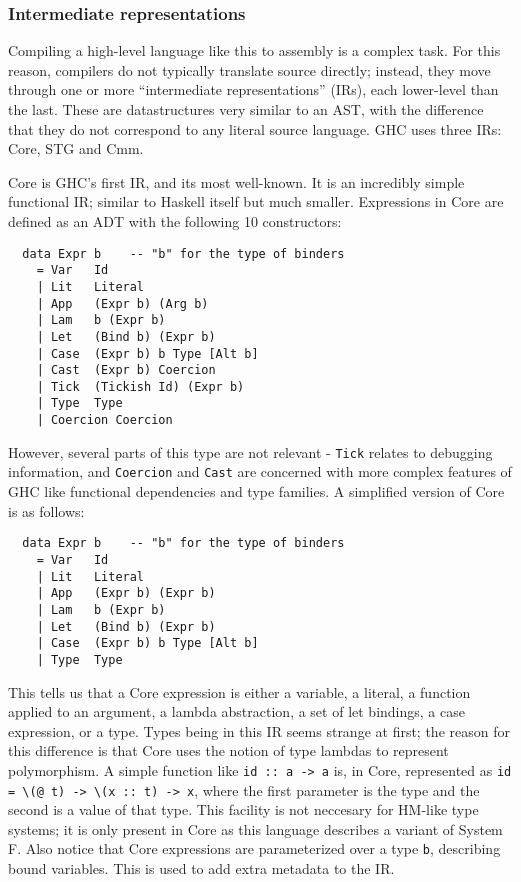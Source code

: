 \documentclass[9pt]{extarticle}
\begin{document}
\subsubsection{Intermediate representations}

Compiling a high-level language like this to assembly is a complex task.
For this reason, compilers do not typically translate source directly;
instead, they move through one or more ``intermediate representations''
(IRs), each lower-level than the last. These are datastructures very
similar to an AST, with the difference that they do not correspond to
any literal source language. GHC uses three IRs: Core, STG and Cmm.

Core is GHC's first IR, and its most well-known. It is an incredibly
simple functional IR; similar to Haskell itself but much smaller.
Expressions in Core are defined as an ADT with the following 10
constructors:

\begin{verbatim}
  data Expr b    -- "b" for the type of binders
    = Var   Id
    | Lit   Literal
    | App   (Expr b) (Arg b)
    | Lam   b (Expr b)
    | Let   (Bind b) (Expr b)
    | Case  (Expr b) b Type [Alt b]
    | Cast  (Expr b) Coercion
    | Tick  (Tickish Id) (Expr b)
    | Type  Type
    | Coercion Coercion
\end{verbatim}

However, several parts of this type are not relevant - \verb'Tick'
relates to debugging information, and \verb'Coercion' and \verb'Cast'
are concerned with more complex features of GHC like functional
dependencies and type families. A simplified version of Core is as
follows:

\begin{verbatim}
  data Expr b    -- "b" for the type of binders
    = Var   Id
    | Lit   Literal
    | App   (Expr b) (Expr b)
    | Lam   b (Expr b)
    | Let   (Bind b) (Expr b)
    | Case  (Expr b) b Type [Alt b]
    | Type  Type
\end{verbatim}

This tells us that a Core expression is either a variable, a literal, a
function applied to an argument, a lambda abstraction, a set of let
bindings, a case expression, or a type. Types being in this IR seems
strange at first; the reason for this difference is that Core uses the
notion of type lambdas to represent polymorphism. A simple function like
\verb'id :: a -> a' is, in Core, represented as
\verb'id = \(@ t) -> \(x :: t) -> x', where the first parameter is the
type and the second is a value of that type. This facility is not
neccesary for HM-like type systems; it is only present in Core as this
language describes a variant of System F.  Also notice that Core
expressions are parameterized over a type \verb'b', describing bound
variables. This is used to add extra metadata to the IR.
\end{document}
